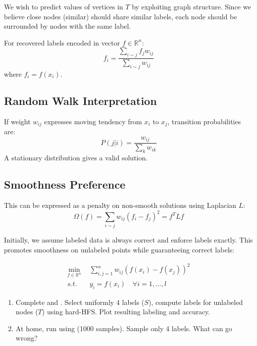 \documentclass[11pt]{article}
\begin{document}
We wish to predict values of vertices in $T$ by exploiting graph structure.
Since we believe close nodes (similar) should share similar labels,
each node should be surrounded by nodes with the same label.

For recovered labels encoded in vector $f \in \mathbb{R}^n$:
\begin{equation}
f_i = \frac{\sum_{i\sim j} f_j w_{ij}}{\sum_{i\sim j} w_{ij}}
\end{equation}
where $f_i = f(x_i)$.

\subsection{Random Walk Interpretation}

If weight $w_{ij}$ expresses moving tendency from $x_i$ to $x_j$,
transition probabilities are:
\begin{equation}
P(j|i) = \frac{w_{ij}}{\sum_k w_{ik}}
\end{equation}
A stationary distribution gives a valid solution.

\subsection{Smoothness Preference}

This can be expressed as a penalty on non-smooth solutions using Laplacian $L$:
\begin{equation}
\Omega(f)=\sum_{i\sim j}w_{ij}(f_{i}-f_{j})^{2} = f^{T}Lf
\end{equation}

Initially, we assume labeled data is always correct and enforce labels exactly.
This promotes smoothness on unlabeled points while guaranteeing correct labels:

\begin{align*}
\min_{f \in \mathbb{R}^{n} }
&  \sum_{i,j=1}^{n} w_{ij} \left( f(x_i)  - f(x_j)  \right)^2 \\
s.t. \quad & y_i  = f(x_i)   \quad \forall i = 1,\dots,l
\end{align*}

\begin{questionbox}
\begin{enumerate}[leftmargin=*]
	\item Complete  and .
		Select uniformly 4 labels ($S$), compute labels for
		unlabeled nodes ($T$) using hard-HFS.
		Plot resulting labeling and accuracy.
	\item At home, run  using 
		(1000 samples). Sample only 4 labels. What can go wrong?
\end{enumerate}
\end{questionbox}
\end{document}
